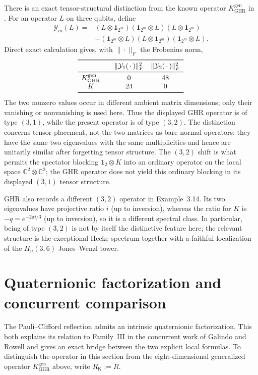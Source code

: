 \documentclass[11pt]{article}
\theoremstyle{remark}
\newcommand{\Id}{\mathbf 1}
\newcommand{\bbC}{\mathbb C}
\begin{document}
There is an exact tensor-structural distinction from the known operator
\(K_{\mathrm{GHR}}^{\mathrm{gen}}\) in
\cite[Eq.~(5.2), Theorem~5.28, and Remark~5.29(1)]{GHR2013}.  For an
operator \(L\) on three qubits, define
\[
\begin{aligned}
  \mathcal Y_m(L)={}&
  (L\otimes\Id_{2^m})(\Id_{2^m}\otimes L)(L\otimes\Id_{2^m})\\
  &-(\Id_{2^m}\otimes L)(L\otimes\Id_{2^m})(\Id_{2^m}\otimes L).
\end{aligned}
\]
Direct exact calculation gives, with \(\|\cdot\|_F\) the Frobenius norm,
\[
\begin{array}{c@{\qquad}cc}
\toprule
 & \|\mathcal Y_1(\,\cdot\,)\|_F^2
 & \|\mathcal Y_2(\,\cdot\,)\|_F^2\\
\midrule
K_{\mathrm{GHR}}^{\mathrm{gen}} & 0 & 48\\
K                  & 24 & 0\\
\bottomrule
\end{array}
\]
The two nonzero values occur in different ambient matrix dimensions; only
their vanishing or nonvanishing is used here.
Thus the displayed GHR operator is of type \((3,1)\), while the present
operator is of type \((3,2)\).  The distinction concerns tensor placement,
not the two matrices as bare normal operators: they have the same two
eigenvalues with the same multiplicities and hence are unitarily similar
after forgetting tensor structure.  The \((3,2)\) shift is what permits the
spectator blocking \(\Id_2\otimes K\) into an ordinary operator on the local
space \(\bbC^2\otimes\bbC^2\); the GHR operator does not yield this ordinary
blocking in its displayed \((3,1)\) tensor structure.

GHR also records a different \((3,2)\) operator in Example~3.14.  Its two
eigenvalues have projective ratio \(i\) (up to inversion), whereas the ratio
for \(K\) is \(-q=e^{-2\pi i/3}\) (up to inversion), so it is a different
spectral class.  In particular, being of type \((3,2)\) is not by itself the
distinctive feature here; the relevant structure is the exceptional Hecke
spectrum together with a faithful localization of the \(H_n(3,6)\)
Jones--Wenzl tower.

\section{Quaternionic factorization and concurrent comparison}
\label{sec:quaternionic}

The Pauli--Clifford reflection admits an intrinsic quaternionic factorization.
This both explains its relation to Family~III in the concurrent work of
Galindo and Rowell and gives an exact bridge between the two explicit local
formulas.  To distinguish the operator in this section from the
eight-dimensional generalized operator \(K_{\mathrm{GHR}}^{\mathrm{gen}}\)
above, write
\(R_{\mathrm K}:=R\).
\end{document}
